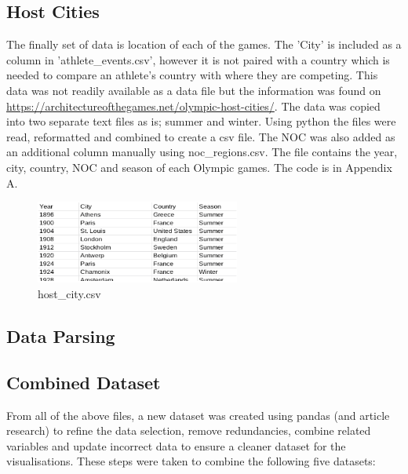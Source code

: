\documentclass[a4 paper, 12pt]{article}
\begin{document}
    \subsection{Host Cities}
    The finally set of data is location of each of the games. The 'City' is included as a column in 'athlete\_events.csv', however it is not paired with a country which is needed to compare an athlete's country with where they are competing. This data was not readily available as a data file but the information was found on \url{https://architectureofthegames.net/olympic-host-cities/}. The data was copied into two separate text files as is; summer and winter. Using python the files were read, reformatted and combined to create a csv file. The NOC was also added as an additional column manually using noc\_regions.csv. The file contains the year, city, country, NOC and season of each Olympic games. The code is in Appendix A. 
        \begin{figure} [H]
            \centering
            \includegraphics[width=0.6\textwidth, frame]
            {./images/host_data.png}  
            \caption{host\_city.csv}                  
        \end{figure}  

\subsection{Data Parsing}
    \subsection{Combined Dataset}
    From all of the above files, a new dataset was created using pandas (and article research) to refine the data selection, remove redundancies, combine related variables and update incorrect data to ensure a cleaner dataset for the visualisations. These steps were taken to combine the following five datasets:
\end{document}
